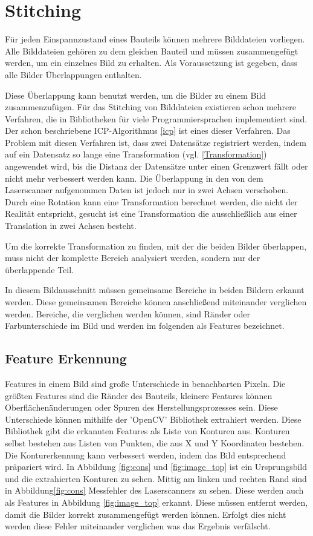 
\chapter{Stitching}

Für jeden Einspannzustand eines Bauteils können mehrere Bilddateien vorliegen.
Alle Bilddateien gehören zu dem gleichen Bauteil und müssen 
zusammengefügt werden, um ein einzelnes Bild zu erhalten. 
Als Voraussetzung ist gegeben, dass alle Bilder Überlappungen enthalten.

Diese Überlappung kann benutzt werden, um die Bilder zu einem Bild zusammenzufügen.
Für das Stitching von Bilddateien existieren schon mehrere Verfahren, die in Bibliotheken
für viele Programmiersprachen implementiert sind. Der schon beschriebene 
ICP-Algorithmus \ref{icp}
ist eines dieser Verfahren. Das Problem mit diesen Verfahren ist, dass zwei 
Datensätze registriert werden, indem auf ein Datensatz so lange eine 
Transformation (vgl. \ref*{Transformation}) angewendet wird, bis
die Distanz der Datensätze unter einen Grenzwert fällt oder nicht mehr verbessert
werden kann. Die Überlappung in den von dem Laserscanner aufgenommen Daten ist jedoch 
nur in zwei Achsen verschoben. Durch eine Rotation kann eine Transformation 
berechnet werden, die nicht der Realität entspricht, gesucht ist eine Transformation 
die ausschließlich aus einer Translation in zwei Achsen besteht.

Um die korrekte Transformation zu finden, mit der die beiden Bilder überlappen,
muss nicht der komplette Bereich analysiert werden, sondern nur der überlappende Teil.

In diesem Bildausschnitt müssen gemeinsame Bereiche in beiden Bildern erkannt werden. 
Diese gemeinsamen Bereiche können anschließend miteinander verglichen werden.
Bereiche, die verglichen werden können, sind Ränder oder Farbunterschiede im Bild 
und werden im folgenden als Features bezeichnet.

\section{Feature Erkennung} \label{contoursearching}

Features in einem Bild sind große Unterschiede in benachbarten Pixeln. Die größten
Features sind die Ränder des Bauteils, kleinere Features können Oberflächenänderungen 
oder Spuren des Herstellungsprozesses sein. Diese Unterschiede können mithilfe 
der 'OpenCV' Bibliothek extrahiert werden. Diese Bibliothek gibt die erkannten 
Features als Liste von Konturen aus. Konturen selbst bestehen aus Listen von 
Punkten, die aus X und Y Koordinaten bestehen. Die Konturerkennung kann verbessert 
werden, indem das Bild entsprechend präpariert wird. In Abbildung \ref{fig:cons} und
\ref{fig:image_top} ist ein Ursprungsbild und die extrahierten Konturen zu sehen.
Mittig am linken und rechten Rand sind in Abbildung\ref{fig:cons}
Messfehler des Laserscanners zu sehen. Diese werden auch als Features in 
Abbildung \ref{fig:image_top} erkannt. Diese müssen entfernt werden, damit die Bilder 
korrekt zusammengefügt werden können. Erfolgt dies nicht werden diese Fehler miteinander
verglichen was das Ergebnis verfälscht.

